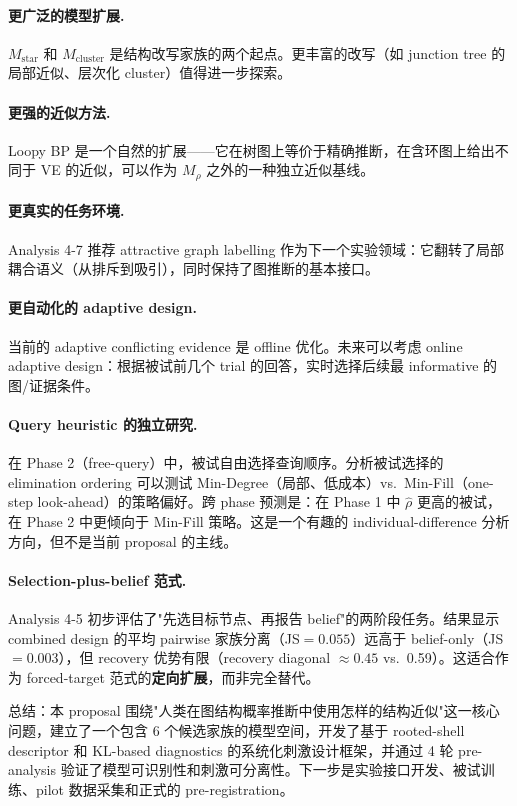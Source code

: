 \documentclass[11pt,a4paper]{ctexart}
\begin{document}
\paragraph{更广泛的模型扩展.}
$M_\mathrm{star}$ 和 $M_\mathrm{cluster}$ 是结构改写家族的两个起点。更丰富的改写（如 junction tree 的局部近似、层次化 cluster）值得进一步探索。

\paragraph{更强的近似方法.}
Loopy BP 是一个自然的扩展——它在树图上等价于精确推断，在含环图上给出不同于 VE 的近似，可以作为 $M_\rho$ 之外的一种独立近似基线。

\paragraph{更真实的任务环境.}
Analysis 4-7 推荐 attractive graph labelling 作为下一个实验领域：它翻转了局部耦合语义（从排斥到吸引），同时保持了图推断的基本接口。

\paragraph{更自动化的 adaptive design.}
当前的 adaptive conflicting evidence 是 offline 优化。未来可以考虑 online adaptive design：根据被试前几个 trial 的回答，实时选择后续最 informative 的图/证据条件。

\paragraph{Query heuristic 的独立研究.}
在 Phase 2（free-query）中，被试自由选择查询顺序。分析被试选择的 elimination ordering 可以测试 Min-Degree（局部、低成本）vs.\ Min-Fill（one-step look-ahead）的策略偏好。跨 phase 预测是：在 Phase 1 中 $\hat\rho$ 更高的被试，在 Phase 2 中更倾向于 Min-Fill 策略。这是一个有趣的 individual-difference 分析方向，但不是当前 proposal 的主线。

\paragraph{Selection-plus-belief 范式.}
Analysis 4-5 初步评估了"先选目标节点、再报告 belief"的两阶段任务。结果显示 combined design 的平均 pairwise 家族分离（JS$=0.055$）远高于 belief-only（JS$=0.003$），但 recovery 优势有限（recovery diagonal $\approx 0.45$ vs.\ 0.59）。这适合作为 forced-target 范式的\textbf{定向扩展}，而非完全替代。

\bigskip
\noindent
总结：本 proposal 围绕"人类在图结构概率推断中使用怎样的结构近似"这一核心问题，建立了一个包含 6 个候选家族的模型空间，开发了基于 rooted-shell descriptor 和 KL-based diagnostics 的系统化刺激设计框架，并通过 4 轮 pre-analysis 验证了模型可识别性和刺激可分离性。下一步是实验接口开发、被试训练、pilot 数据采集和正式的 pre-registration。



\end{document}
